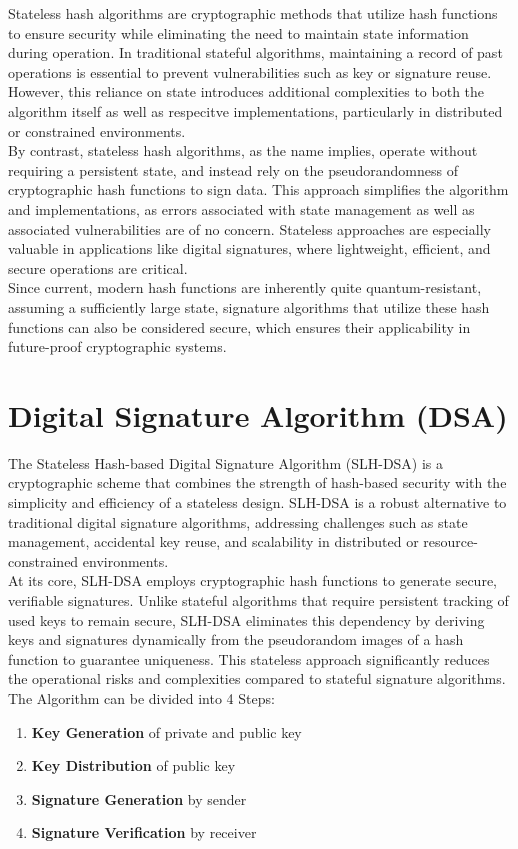 \documentclass[journal=tosc,notanonymous]{iacrtrans}
\begin{document}
Stateless hash algorithms are cryptographic methods that utilize hash functions to ensure security while eliminating the need to maintain state information during operation.
In traditional stateful algorithms, maintaining a record of past operations is essential to prevent vulnerabilities such as key or signature reuse.
However, this reliance on state introduces additional complexities to both the algorithm itself as well as respecitve implementations, particularly in distributed or constrained environments.\cite{jungk-2024}
\\
By contrast, stateless hash algorithms, as the name implies, operate without requiring a persistent state, and instead rely on the pseudorandomness of cryptographic hash functions to sign data.
This approach simplifies the algorithm and implementations, as errors associated with state management as well as associated vulnerabilities are of no concern.
Stateless approaches are especially valuable in applications like digital signatures, where lightweight, efficient, and secure operations are critical.\cite{unknown-author-2025}
\\
Since current, modern hash functions are inherently quite quantum-resistant, assuming a sufficiently large state, signature algorithms that utilize these hash functions can also be considered secure, which ensures their applicability in future-proof cryptographic systems.

\section{Digital Signature Algorithm (DSA)}

The Stateless Hash-based Digital Signature Algorithm (SLH-DSA) is a cryptographic scheme that combines the strength of hash-based security with the simplicity and efficiency of a stateless design. SLH-DSA is a robust alternative to traditional digital signature algorithms, addressing challenges such as state management, accidental key reuse, and scalability in distributed or resource-constrained environments.
\\
At its core, SLH-DSA employs cryptographic hash functions to generate secure, verifiable signatures. Unlike stateful algorithms that require persistent tracking of used keys to remain secure, SLH-DSA eliminates this dependency by deriving keys and signatures dynamically from the pseudorandom images of a hash function to guarantee uniqueness.
This stateless approach significantly reduces the operational risks and complexities compared to stateful signature algorithms.
\\
The Algorithm can be divided into 4 Steps:
\begin{enumerate}
	\item \textbf{Key Generation} of private and public key
	\item \textbf{Key Distribution} of public key
	\item \textbf{Signature Generation} by sender
	\item \textbf{Signature Verification} by receiver
\end{enumerate}
\end{document}
